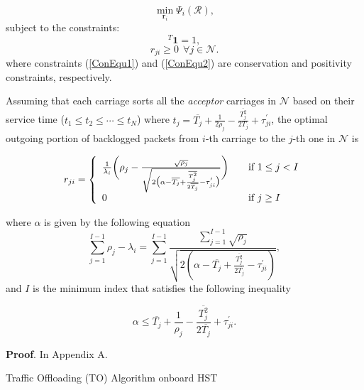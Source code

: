 \documentclass[journal]{IEEEtran}
\begin{document}
{\begin{equation}
\operatorname*{min}_{\boldsymbol{r}_{i}}  \Psi_{i}(\mathcal{R}),
\label{ObjectiveDelay}
\end{equation}
\noindent
subject to the constraints:
\begin{equation}
[\boldsymbol{r}_{i}]^{T}\textbf{1}=1, 
\label{ConEqu1}
\end{equation}
\begin{equation}
{r_{ji}}\geq 0~~\forall j \in \mathcal{N}.
\label{ConEqu2}
\end{equation}
\noindent
where constraints (\ref{ConEqu1}) and (\ref{ConEqu2}) are conservation and positivity constraints, respectively.

Assuming that each carriage sorts all the \textsl{acceptor} carriages in $\mathcal{N}$ based on their service time ($t_1\leq t_2 \leq \cdots \leq t_N$) where $t_{j}= \overline{T_j} + \frac{1}{2\rho_{j}} - \frac{\overline{T_{j}^{2}}}{2T_{j}} + \tau_{ji}^'$, the optimal outgoing portion of backlogged packets from $i$-th carriage to the $j$-th one in $\mathcal{N}$ is


\[ r_{ji} = \left\{
\begin{array}{l l}
\frac{1}{\lambda_{i}} \bigg( \rho_{j} - \frac{\sqrt{\rho_{j}}}{\sqrt{2\big(\alpha -\overline{T_j} + \frac{\overline{T_j^2}}{2\overline{T_j}}-\tau_{ji}^{'}\big)}}  \bigg)  & \quad \text{if $1\leq j < I$}\\
0 & \quad \text{if  $ j\geq I$} 
\end{array} \right.\]

\noindent
where $\alpha$ is given by the following equation
\begin{equation}
	\sum_{j=1}^{I-1} \rho_{j} -\lambda_i = \sum_{j=1}^{I-1} \frac{\sum_{j=1}^{I-1} \sqrt{\rho_{j}}}{\sqrt{2(\alpha -\overline{T_{j}}+\frac{\overline{T_{j}^2}}{2\overline{T_j}} - \tau_{ji}^{'})}},
\end{equation}
\noindent
and $I$ is the minimum index that satisfies the following inequality

\begin{equation}
	\alpha \leq \overline{T_j} + \frac{1}{\rho_{j}} - \frac{\overline{T_j^2}}{2\overline{T_j}} + \tau_{ji}^{'} .
\end{equation}

\textbf{Proof}. In Appendix A.%
\par


\begin{algorithm}
	\caption{Traffic Offloading (TO) Algorithm onboard HST}
	

\end{algorithm}}
\end{document}
